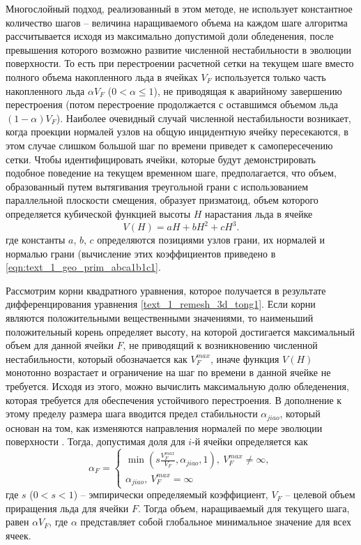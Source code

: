 Многослойный подход, реализованный в этом методе, не использует константное количество шагов -- величина наращиваемого объема на каждом шаге алгоритма рассчитывается исходя из максимально допустимой доли обледенения, после превышения которого возможно развитие численной нестабильности в эволюции поверхности.
То есть при перестроении расчетной сетки на текущем шаге вместо полного объема накопленного льда в ячейках $V_F$ используется только часть накопленного льда $\alpha V_F$ ($0 < \alpha \le 1$), не приводящая к аварийному завершению перестроения (потом перестроение продолжается с оставшимся объемом льда $(1 - \alpha) V_F$).
Наиболее очевидный случай численной нестабильности возникает, когда проекции нормалей узлов на общую инцидентную ячейку пересекаются, в этом случае слишком большой шаг по времени приведет к самопересечению сетки.
Чтобы идентифицировать ячейки, которые будут демонстрировать подобное поведение на текущем временном шаге, предполагается, что объем, образованный путем вытягивания треугольной грани с использованием параллельной плоскости смещения, образует призматоид, объем которого определяется кубической функцией высоты $H$ нарастания льда в ячейке
\begin{equation}\label{text_1_remesh_3d_tong1}
	V(H)=aH+bH^2+cH^3.
\end{equation}
где константы $a$, $b$, $c$ определяются позициями узлов грани, их нормалей и нормалью грани (вычисление этих коэффициентов приведено в \eqref{eqn:text_1_geo_prim_abca1b1c1}.

Рассмотрим корни квадратного уравнения, которое получается в результате дифференцирования уравнения \eqref{text_1_remesh_3d_tong1}.
Если корни являются положительными вещественными значениями, то наименьший положительный корень определяет высоту, на которой достигается максимальный объем для данной ячейки $F$, не приводящий к возникновению численной нестабильности, который обозначается как $V_F^{max}$, иначе функция $V(H)$ монотонно возрастает и ограничение на шаг по времени в данной ячейке не требуется.
Исходя из этого, можно вычислить максимальную долю обледенения, которая требуется для обеспечения устойчивого перестроения.
В дополнение к этому пределу размера шага вводится предел стабильности $\alpha_{jiao}$, который основан на том, как изменяются направления нормалей по мере эволюции поверхности \cite{Jiao2007Offsetting}.
Тогда, допустимая доля для $i$-й ячейки определяется как
\begin{equation}
\alpha_F =
	\begin{cases}
		\min \left( s \frac{V_F^{max}}{V_F}, \alpha_{jiao}, 1 \right), \ V_F^{max} \ne \infty, \\
		\alpha_{jiao}, \ V_F^{max} = \infty
	\end{cases}
\end{equation}
где $s$ ($0 < s < 1$) -- эмпирически определяемый коэффициент, $V_F$ -- целевой объем приращения льда для ячейки $F$.
Тогда объем, наращиваемый для текущего шага, равен $\alpha V_F$, где $\alpha$ представляет собой глобальное минимальное значение для всех ячеек.

